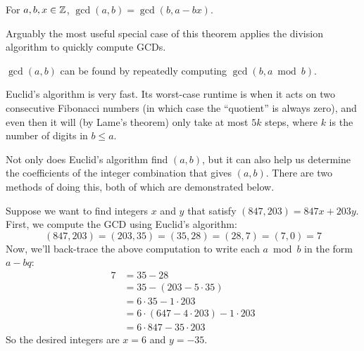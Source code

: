 \documentclass[../m55main.tex]{subfiles}
\begin{document}
\begin{theorem}
    For $a,b,x \in \mathbb{Z}$, $\gcd (a,b) = \gcd (b, a - bx)$.
\end{theorem}


Arguably the most useful special case of this theorem applies the division algorithm to quickly compute GCDs.

\begin{corollary}
    $\gcd (a,b)$ can be found by repeatedly computing $\gcd (b, a \bmod b)$.
\end{corollary}


Euclid's algorithm is very fast.
Its worst-case runtime is when it acts on two consecutive Fibonacci numbers (in which case the ``quotient'' is always zero), and even then it will (by Lame's theorem) only take at most $5k$ steps, where $k$ is the number of digits in $b \leq a$.

Not only does Euclid's algorithm find $(a,b)$, but it can also help us determine the coefficients of the integer combination that gives $(a,b)$.
There are two methods of doing this, both of which are demonstrated below.

\begin{example}
    Suppose we want to find integers $x$ and $y$ that satisfy $(847, 203) = 847x + 203y$.
    First, we compute the GCD using Euclid's algorithm:
    \[ (847,203) = (203,35) = (35,28) = (28,7) = (7,0) = 7 \]
    Now, we'll back-trace the above computation to write each $a \bmod b$ in the form $a - bq$:
    \begin{align*}
        7 &= 35 - 28 \\
        &= 35 - (203 - 5 \cdot 35) \\
        &= 6 \cdot 35 - 1 \cdot 203 \\
        &= 6 \cdot (647 - 4 \cdot 203) - 1 \cdot 203 \\
        &= 6 \cdot 847 - 35 \cdot 203
    \end{align*}
    So the desired integers are $x = 6$ and $y = -35$.
\end{example}
\end{document}
